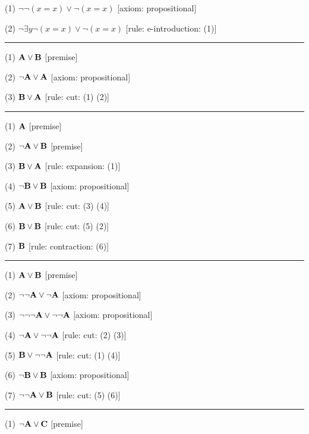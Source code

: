 \item{(1)} $\neg \neg (x = x) \lor \neg (x = x)$ \hfill [axiom: propositional]
\item{(2)} $\neg \exists y \neg (x = x) \lor \neg (x = x)$ \hfill [rule: e-introduction: (1)]
\medskip
\hrule
\medskip
\item{(1)} ${\bf A} \lor {\bf B}$ \hfill [premise]
\item{(2)} $\neg {\bf A} \lor {\bf A}$ \hfill [axiom: propositional]
\item{(3)} ${\bf B} \lor {\bf A}$ \hfill [rule: cut: (1) (2)]
\medskip
\hrule
\medskip
\item{(1)} ${\bf A}$ \hfill [premise]
\item{(2)} $\neg {\bf A} \lor {\bf B}$ \hfill [premise]
\item{(3)} ${\bf B} \lor {\bf A}$ \hfill [rule: expansion: (1)]
\item{(4)} $\neg {\bf B} \lor {\bf B}$ \hfill [axiom: propositional]
\item{(5)} ${\bf A} \lor {\bf B}$ \hfill [rule: cut: (3) (4)]
\item{(6)} ${\bf B} \lor {\bf B}$ \hfill [rule: cut: (5) (2)]
\item{(7)} ${\bf B}$ \hfill [rule: contraction: (6)]
\medskip
\hrule
\medskip
\item{(1)} ${\bf A} \lor {\bf B}$ \hfill [premise]
\item{(2)} $\neg \neg {\bf A} \lor \neg {\bf A}$ \hfill [axiom: propositional]
\item{(3)} $\neg \neg \neg {\bf A} \lor \neg \neg {\bf A}$ \hfill [axiom: propositional]
\item{(4)} $\neg {\bf A} \lor \neg \neg {\bf A}$ \hfill [rule: cut: (2) (3)]
\item{(5)} ${\bf B} \lor \neg \neg {\bf A}$ \hfill [rule: cut: (1) (4)]
\item{(6)} $\neg {\bf B} \lor {\bf B}$ \hfill [axiom: propositional]
\item{(7)} $\neg \neg {\bf A} \lor {\bf B}$ \hfill [rule: cut: (5) (6)]
\medskip
\hrule
\medskip
\item{(1)} $\neg {\bf A} \lor {\bf C}$ \hfill [premise]
